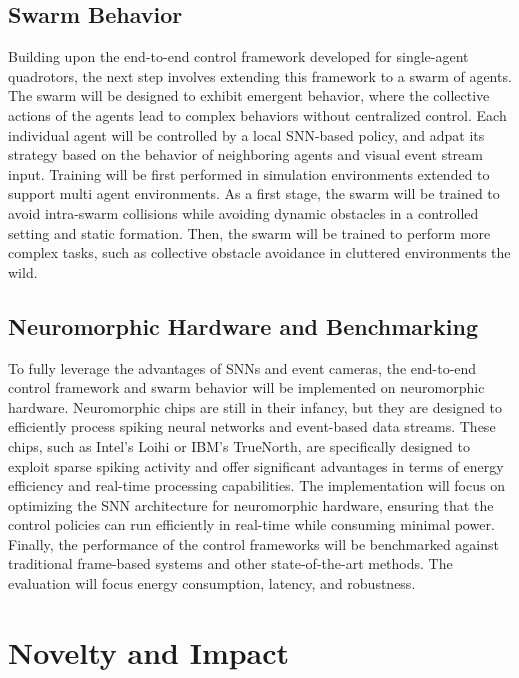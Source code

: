 \documentclass{article}
\begin{document}
\subsection{Swarm Behavior}
Building upon the end-to-end control framework developed for single-agent quadrotors, the next step involves extending this framework to a swarm of agents. The swarm will be designed to exhibit emergent behavior, where the collective actions of the agents lead to complex behaviors without centralized control. Each individual agent will be controlled  by a local SNN-based policy, and adpat its strategy based on the behavior of neighboring agents and visual event stream input. Training will be first performed in simulation environments extended to support multi agent environments. As a first stage, the swarm will be trained to avoid intra-swarm collisions while avoiding dynamic obstacles in a controlled setting and static formation. Then, the swarm will be trained to perform more complex tasks, such as collective obstacle avoidance in cluttered environments the wild.  

\subsection{Neuromorphic Hardware and Benchmarking}
To fully leverage the advantages of SNNs and event cameras, the end-to-end control framework and swarm behavior will be implemented on neuromorphic hardware. Neuromorphic chips are still in their infancy, but they are designed to efficiently process spiking neural networks and event-based data streams. These chips, such as Intel's Loihi or IBM's TrueNorth, are specifically designed to exploit sparse spiking activity and offer significant advantages in terms of energy efficiency and real-time processing capabilities. The implementation will focus on optimizing the SNN architecture for neuromorphic hardware, ensuring that the control policies can run efficiently in real-time while consuming minimal power. Finally, the performance of the control frameworks will be benchmarked against traditional frame-based systems and other state-of-the-art methods. The evaluation will focus energy consumption, latency, and robustness.

\section{Novelty and Impact}
\end{document}
